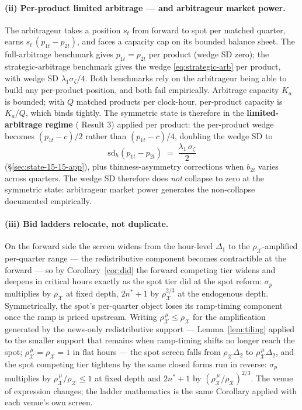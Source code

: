 \documentclass[11pt,a4paper]{article}
\theoremstyle{definition}
\theoremstyle{remark}
\theoremstyle{plain}
\begin{document}
\paragraph{(ii) Per-product limited arbitrage --- and arbitrageur market power.} The arbitrageur takes a position $s_t$ from forward to spot per matched quarter, earns $s_t\,(p_{1t} - p_{2t})$, and faces a capacity cap on its bounded balance sheet. The full-arbitrage benchmark gives $p_{1t} = p_{2t}$ per product (wedge SD zero); the strategic-arbitrage benchmark gives the \citeauthor{ito_reguant_2016} wedge \eqref{eq:strategic-arb} per product, with wedge SD $\lambda_1 \sigma_\zeta / 4$. Both benchmarks rely on the arbitrageur being able to build any per-product position, and both fail empirically. Arbitrage capacity $K_a$ is bounded; with $Q$ matched products per clock-hour, per-product capacity is $K_a/Q$, which binds tightly. The symmetric state is therefore in the \textbf{limited-arbitrage regime} (\citeauthor{ito_reguant_2016} Result 3) applied per product: the per-product wedge becomes $(p_{1t}-c)/2$ rather than $(p_{1t}-c)/4$, doubling the wedge SD to
\begin{equation}
\boxed{\;\mathrm{sd}_h(p_{1t} - p_{2t}) \;=\; \frac{\lambda_1\, \sigma_\zeta}{2}\;}
\label{eq:wedge-sd-limited}
\end{equation}
(\S\ref{sec:state-15-15-app}), plus thinness-asymmetry corrections when $b_{2t}$ varies across quarters. The wedge SD therefore does \emph{not} collapse to zero at the symmetric state: arbitrageur market power generates the non-collapse documented empirically.

\paragraph{(iii) Bid ladders relocate, not duplicate.} On the forward side the screen widens from the hour-level $\Delta_1$ to the $\rho_{\mathcal X}$-amplified per-quarter range --- the redistributive component becomes contractible at the forward --- so by Corollary~\ref{cor:did} the forward competing tier widens and deepens in critical hours exactly as the spot tier did at the spot reform: $\sigma_p$ multiplies by $\rho_{\mathcal X}$ at fixed depth, $2n^*+1$ by $\rho_{\mathcal X}^{2/3}$ at the endogenous depth. Symmetrically, the spot's per-quarter object loses its ramp-timing component once the ramp is priced upstream. Writing $\rho^{\,\mu}_{\mathcal X} \le \rho_{\mathcal X}$ for the amplification generated by the news-only redistributive support --- Lemma~\ref{lem:tiling} applied to the smaller support that remains when ramp-timing shifts no longer reach the spot; $\rho^{\,\mu}_{\mathcal X} = \rho_{\mathcal X} = 1$ in flat hours --- the spot screen falls from $\rho_{\mathcal X}\Delta_2$ to $\rho^{\,\mu}_{\mathcal X}\Delta_2$, and the spot competing tier tightens by the same closed forms run in reverse: $\sigma_p$ multiplies by $\rho^{\,\mu}_{\mathcal X}/\rho_{\mathcal X} \le 1$ at fixed depth and $2n^*+1$ by $(\rho^{\,\mu}_{\mathcal X}/\rho_{\mathcal X})^{2/3}$. The venue of expression changes; the ladder mathematics is the same Corollary applied with each venue's own screen.
\end{document}
